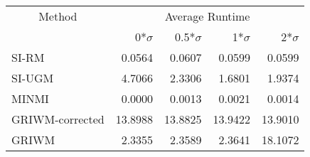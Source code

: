 
\begin{tabular}{lrrrr}
\toprule
\multicolumn{1}{c}{Method} & \multicolumn{4}{c}{Average Runtime} \\
 & 0*$\sigma$ & 0.5*$\sigma$ & 1*$\sigma$ & 2*$\sigma$\\
\midrule
SI-RM & 0.0564 & 0.0607 & 0.0599 & 0.0599\\
SI-UGM & 4.7066 & 2.3306 & 1.6801 & 1.9374\\
MINMI & 0.0000 & 0.0013 & 0.0021 & 0.0014\\
GRIWM-corrected & 13.8988 & 13.8825 & 13.9422 & 13.9010\\
GRIWM & 2.3355 & 2.3589 & 2.3641 & 18.1072\\
\bottomrule
\end{tabular}
